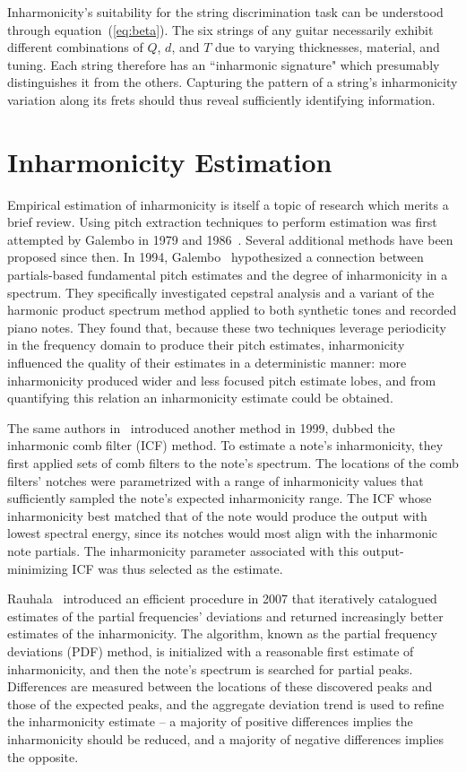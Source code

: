 \documentclass[12pt]{cmuthesis}
\begin{document}
Inharmonicity's suitability for the string discrimination task can be understood through equation~(\ref{eq:beta}). The six strings of any guitar necessarily exhibit different combinations of $Q$, $d$, and $T$ due to varying thicknesses, material, and tuning. Each string therefore has an ``inharmonic signature" which presumably distinguishes it from the others. Capturing the pattern of a string's inharmonicity variation along its frets should thus reveal sufficiently identifying information.

\section{Inharmonicity Estimation}
\label{lit-beta-est}
Empirical estimation of inharmonicity is itself a topic of research which merits a brief review. Using pitch extraction techniques to perform estimation was first attempted by Galembo in 1979 and 1986~\cite{galembo1979,galembo1987}. Several additional methods have been proposed since then. In 1994, Galembo~\cite{galembo1994} hypothesized a connection between partials-based fundamental pitch estimates and the degree of inharmonicity in a spectrum. They specifically investigated cepstral analysis and a variant of the harmonic product spectrum method applied to both synthetic tones and recorded piano notes. They found that, because these two techniques leverage periodicity in the frequency domain to produce their pitch estimates, inharmonicity influenced the quality of their estimates in a deterministic manner: more inharmonicity produced wider and less focused pitch estimate lobes, and from quantifying this relation an inharmonicity estimate could be obtained.
 
 The same authors in~\cite{galembo1999} introduced another method in 1999, dubbed the inharmonic comb filter (ICF) method. To estimate a note's inharmonicity, they first applied sets of comb filters to the note's spectrum. The locations of the comb filters' notches were parametrized with a range of inharmonicity values that sufficiently sampled the note's expected inharmonicity range. The ICF whose inharmonicity best matched that of the note would produce the output with lowest spectral energy, since its notches would most align with the inharmonic note partials. The inharmonicity parameter associated with this output-minimizing ICF was thus selected as the estimate.
 
Rauhala~\cite{rauhala2007} introduced an efficient procedure in 2007 that iteratively catalogued estimates of the partial frequencies' deviations and returned increasingly better estimates of the inharmonicity. The algorithm, known as the partial frequency deviations (PDF) method, is initialized with a reasonable first estimate of inharmonicity, and then the note's spectrum is searched for partial peaks. Differences are measured between the locations of these discovered peaks and those of the expected peaks, and the aggregate deviation trend is used to refine the inharmonicity estimate -- a majority of positive differences implies the inharmonicity should be reduced, and a majority of negative differences implies the opposite.
\end{document}
